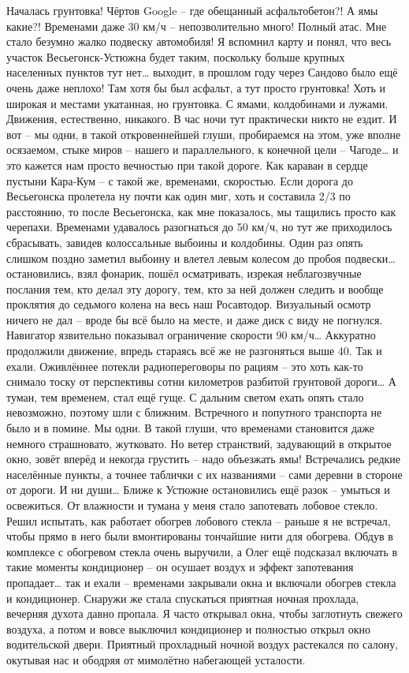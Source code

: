 Началась грунтовка! Чёртов Google – где обещанный асфальтобетон?! А ямы какие?! Временами даже 30 км/ч – непозволительно много! Полный атас. Мне стало безумно жалко подвеску автомобиля! Я вспомнил карту и понял, что весь участок Весьегонск-Устюжна будет таким, поскольку больше крупных населенных пунктов тут нет… выходит, в прошлом году через Сандово было ещё очень даже неплохо! Там хотя бы был асфальт, а тут просто грунтовка! Хоть и широкая и местами укатанная, но грунтовка. С ямами, колдобинами и лужами. Движения, естественно, никакого. В час ночи тут практически никто не ездит. И вот – мы одни, в такой откровеннейшей глуши, пробираемся на этом, уже вполне осязаемом, стыке миров – нашего и параллельного, к конечной цели – Чагоде… и это кажется нам просто вечностью при такой дороге. Как караван в сердце пустыни Кара-Кум – с такой же, временами, скоростью.
Если дорога до Весьегонска пролетела ну почти как один миг, хоть и составила 2/3 по расстоянию, то после Весьегонска, как мне показалось, мы тащились просто как черепахи. Временами удавалось разогнаться до 50 км/ч, но тут же приходилось сбрасывать, завидев колоссальные выбоины и колдобины. Один раз опять слишком поздно заметил выбоину и влетел левым колесом до пробоя подвески… остановились, взял фонарик, пошёл осматривать, изрекая неблагозвучные послания тем, кто делал эту дорогу, тем, кто за ней должен следить и вообще проклятия до седьмого колена на весь наш Росавтодор. Визуальный осмотр ничего не дал – вроде бы всё было на месте, и даже диск с виду не погнулся. Навигатор язвительно показывал ограничение скорости 90 км/ч… Аккуратно продолжили движение, впредь стараясь всё же не разгоняться выше 40. Так и ехали. Оживлённее потекли радиопереговоры по рациям – это хоть как-то снимало тоску от перспективы сотни километров разбитой грунтовой дороги…
А туман, тем временем, стал ещё гуще. С дальним светом ехать опять стало невозможно, поэтому шли с ближним. Встречного и попутного транспорта не было и в помине. Мы одни. В такой глуши, что временами становится даже немного страшновато, жутковато. Но ветер странствий, задувающий в открытое окно, зовёт вперёд и некогда грустить – надо объезжать ямы! Встречались редкие населённые пункты, а точнее таблички с их названиями – сами деревни в стороне от дороги. И ни души…
Ближе к Устюжне остановились ещё разок – умыться и освежиться. От влажности и тумана у меня стало запотевать лобовое стекло. Решил испытать, как работает обогрев лобового стекла – раньше я не встречал, чтобы прямо в него были вмонтированы тончайшие нити для обогрева. Обдув в комплексе с обогревом стекла очень выручили, а Олег ещё подсказал включать в такие моменты кондиционер – он осушает воздух и эффект запотевания пропадает… так и ехали – временами закрывали окна и включали обогрев стекла и кондиционер. Снаружи же стала спускаться приятная ночная прохлада, вечерняя духота давно пропала. Я часто открывал окна, чтобы заглотнуть свежего воздуха, а потом и вовсе выключил кондиционер и полностью открыл окно водительской двери. Приятный прохладный ночной воздух растекался по салону, окутывая нас и ободряя от мимолётно набегающей усталости.
